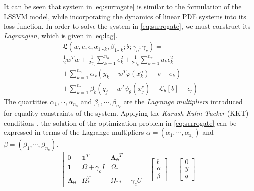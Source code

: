 It can be seen that system in \cref{eq:surrogate} is similar to the formulation of the LSSVM model, 
while incorporating the dynamics of linear PDE systems into its loss function. In order to solve 
the system in \cref{eq:surrogate}, we must construct its \emph{Lagrangian}, which is given in 
\cref{eq:lag}.
%
\begin{equation}\label{eq:lag}
  \begin{aligned}
    & \mathfrak{L}(
      w, e,\epsilon, \alpha_{1 \cdots k}, \beta_{1 \cdots k}; \theta; \gamma_{o}; \gamma_{c}
    ) = \\ 
    & \frac{1}{2} w^{T}w + \frac{1}{2\gamma_{o}} \sum_{k = 1}^{n_{o}}{e^{2}_{k}} +
    \frac{1}{2\gamma_{c}} \sum_{k = 1}^{n_{c}}{u_{k} \epsilon^{2}_{k}} \\
    & + \sum_{k = 1}^{n_{o}}{\alpha_{k}(y_{k} - w^{T}\varphi(x^{o}_{k}) - b - e_{k})} \\
    & + \sum_{k = 1}^{n_{c}}{\beta_{k} (q_{j} - w^{T}\psi_{\theta}(x^{c}_{j}) - 
    \mathcal{L}_{\theta}[b] - \epsilon_{j})} 
  \end{aligned}
\end{equation}
%
The quantities $\alpha_{1}, \cdots, \alpha_{n_{o}}$ and $\beta_{1}, \cdots, \beta_{n_{c}}$ are the 
\emph{Lagrange multipliers} introduced for equality constraints of the system. Applying the 
\emph{Karush-Kuhn-Tucker} (KKT) conditions \citep{karush1939minima,kuhn1951nonlinear}, the solution 
of the optimization problem in \cref{eq:surrogate} can be expressed in terms of the Lagrange 
multipliers 
$\alpha = (\alpha_{1}, \cdots, \alpha_{n_{o}})$ and $\beta = (\beta_{1}, \cdots, \beta_{n_{c}})$.
%
\begin{equation}\label{eq:solution}
  \begin{bmatrix}
    0 & \mathbf{1}^{T} & \mathbf{\Lambda_{\theta}}^{T} \\ 
    \mathbf{1} & \Omega + \gamma_{o}I  & \Omega_*\\ 
    \mathbf{\Lambda_{\theta}} & \Omega_{*}^{T}  & \Omega_{**} + \gamma_{c}U 
  \end{bmatrix} \begin{bmatrix}
    b\\ 
    \alpha\\ 
    \beta
  \end{bmatrix} = \begin{bmatrix}
    0\\ 
    y\\ 
    q
  \end{bmatrix}
\end{equation}
